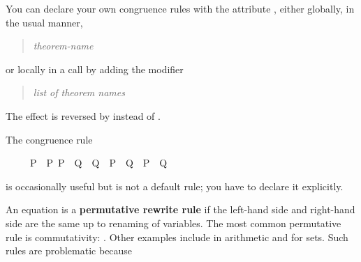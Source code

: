 \begin{isabellebody}
\begin{isamarkuptext}
You can declare your own congruence rules with the attribute ,
either globally, in the usual manner,
\begin{quote}
 \textit{theorem-name} 
\end{quote}
or locally in a  call by adding the modifier
\begin{quote}
 \textit{list of theorem names}
\end{quote}
The effect is reversed by  instead of .

\begin{warn}
The congruence rule 
\begin{isabelle}%
\ \ \ \ \ {}P\ {}\ P{}{}\ P{}\ {}\ Q\ {}\ Q{}{}\ {}\ {}P\ {}\ Q{}\ {}\ {}P{}\ {}\ Q{}{}%
\end{isabelle}
\par\noindent
is occasionally useful but is not a default rule; you have to declare it explicitly.
\end{warn}%
\end{isamarkuptext}%
\isamarkuptrue%
%
\isamarkuptrue%
%
\begin{isamarkuptext}%
%
An equation is a \textbf{permutative rewrite rule} if the left-hand
side and right-hand side are the same up to renaming of variables.  The most
common permutative rule is commutativity: .  Other examples
include  in arithmetic and  for sets. Such rules are problematic because

\end{isamarkuptext}
\end{isabellebody}
